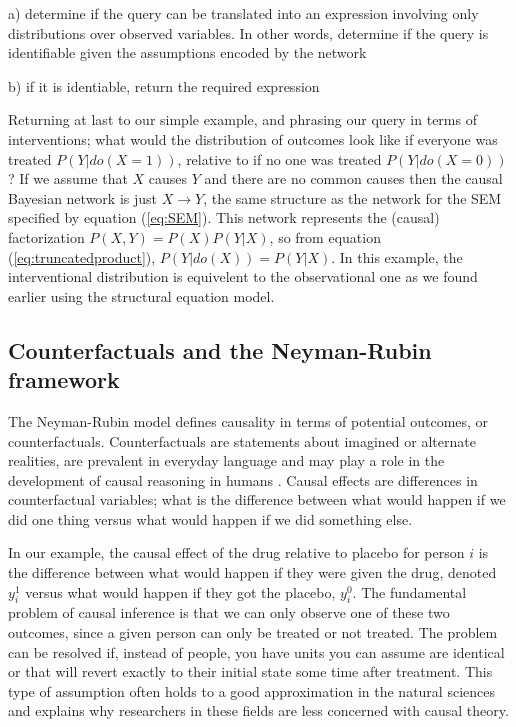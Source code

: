 \documentclass[11pt,a4paper]{article}
\begin{document}
a) determine if the query can be translated into an expression involving only distributions over observed variables. In other words, determine if the query is identifiable given the assumptions encoded by the network

b) if it is identiable, return the required expression

Returning at last to our simple example, and phrasing our query in terms of interventions; what would the distribution of outcomes look like if everyone was treated $P(Y|do(X=1))$, relative to if no one was treated $P(Y|do(X=0))$? If we assume that $X$ causes $Y$ and there are no common causes then the causal Bayesian network is just $X \rightarrow Y$, the same structure as the network for the SEM specified by equation (\ref{eq:SEM}). This network represents the (causal) factorization  $P(X,Y) = P(X)P(Y|X)$, so from equation (\ref{eq:truncatedproduct}), $P(Y|do(X)) = P(Y|X)$. In this example, the interventional distribution is equivelent to the observational one as we found earlier using the structural equation model. 

\subsection{Counterfactuals and the Neyman-Rubin framework}

The Neyman-Rubin model \cite{Rubin1974,Rubin1978,Rosenbaum1983, Rubin2005,Rubin2008} defines causality in terms of potential outcomes, or counterfactuals. Counterfactuals are statements about imagined or alternate realities, are prevalent in everyday language and may play a role in the development of causal reasoning in humans \cite{Weisberg2013}. Causal effects are differences in counterfactual variables; what is the difference between what would happen if we did one thing versus what would happen if we did something else. 

In our example, the causal effect of the drug relative to placebo for person $i$ is the difference between what would happen if they were given the drug, denoted $y_{i}^{1}$ versus what would happen if they got the placebo, $y_{i}^{0}$. The fundamental problem of causal inference is that we can only observe one of these two outcomes, since a given person can only be treated or not treated. The problem can be resolved if, instead of people, you have units you can assume are identical or that will revert exactly to their initial state some time after treatment. This type of assumption often holds to a good approximation in the natural sciences and explains why researchers in these fields are less concerned with causal theory. 
\end{document}
